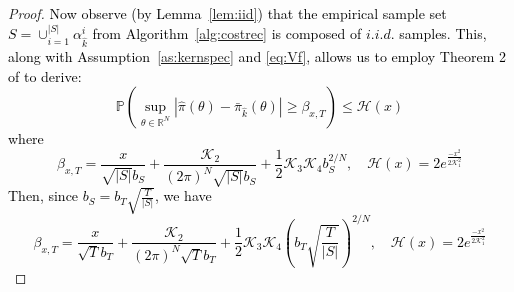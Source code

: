 \documentclass[journal,onecolumn]{IEEEtran}
\newcommand{\reals}{\mathbb{R}}
\newcommand{\PR}{\mathbb{P}}
\newcommand{\dimn}{N}
\newcommand{\mk}{\mathcal{K}}
\newcommand{\kfv}{x} %
\newcommand{\snum}{T}
\newcommand{\hk}{\hat{k}}
\begin{document}
{{\begin{proof}
 \textcolor{black}{Now observe (by Lemma~\ref{lem:iid}) that the empirical sample set $S = \cup_{i=1}^{|S|}\alpha_{\hk}^i$ from Algorithm~\ref{alg:costrec} is composed of $i.i.d.$ samples. This, along with Assumption~\ref{as:kernspec} and \eqref{eq:Vf}, allows us to employ Theorem 2 of \cite{vogel2013uniform} to derive:
 \begin{equation}
 \label{eq:cione}
\PR\left(\sup_{\theta\in\reals^{\dimn}}|\hat{\pi}(\theta) - \bar{\pi}_{\hk}(\theta)| \geq \beta_{\kfv,T} \right) \leq \mathcal{H}(\kfv) 
 \end{equation}
where 
\begin{equation*}
    \beta_{\kfv,T} = \frac{\kfv}{\sqrt{|S|}b_S} + \frac{\mk_2}{(2\pi)
^{\dimn}\sqrt{|S|}b_S} + \frac{1}{2}\mk_3\mk_4b_S^{2/\dimn}, \quad \mathcal{H}(\kfv) = 2e^{\frac{-\kfv^2}{2\mk_1^2}}
\end{equation*}
Then, since $b_S = b_T\sqrt{\frac{T}{|S|}}$, we have 
\begin{equation}
\label{eq:bhdef}
    \beta_{\kfv,\snum} = \frac{\kfv}{\sqrt{\snum}b_T} + \frac{\mk_2}{(2\pi)
^{\dimn}\sqrt{\snum}b_T} + \frac{1}{2}\mk_3\mk_4\left(b_T\sqrt{\frac{T}{|S|}}\right)^{2/\dimn}, \quad \mathcal{H}(\kfv) = 2e^{\frac{-\kfv^2}{2\mk_1^2}}
\end{equation}}

\end{proof}}}
\end{document}
